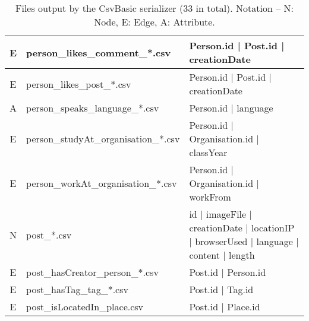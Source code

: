 \begin{table}[htb]
\begin{tabular}{|c|p{4.6cm}|p{9.8cm}|}
        E                       & person\_likes\_comment\_*.csv           & Person.id | Post.id | creationDate                                                      \\ \hline
        E                       & person\_likes\_post\_*.csv              & Person.id | Post.id | creationDate                                                      \\ \hline
        A                       & person\_speaks\_language\_*.csv         & Person.id | language                                                                    \\ \hline
        E                       & person\_studyAt\_organisation\_*.csv    & Person.id | Organisation.id | classYear                                                 \\ \hline
        E                       & person\_workAt\_organisation\_*.csv     & Person.id | Organisation.id | workFrom                                                  \\ \hline
        N                       & post\_*.csv                             & id | imageFile | creationDate | locationIP | browserUsed | language | content | length  \\ \hline
        E                       & post\_hasCreator\_person\_*.csv         & Post.id | Person.id                                                                     \\ \hline
        E                       & post\_hasTag\_tag\_*.csv                & Post.id | Tag.id                                                                        \\ \hline
        E                       & post\_isLocatedIn\_place.csv            & Post.id | Place.id                                                                      \\ \hline
    \end{tabular}
    \caption{Files output by the CsvBasic serializer (33 in total). Notation -- N: Node, E: Edge, A: Attribute.}
    \label{table:csv_basic}
\end{table}
